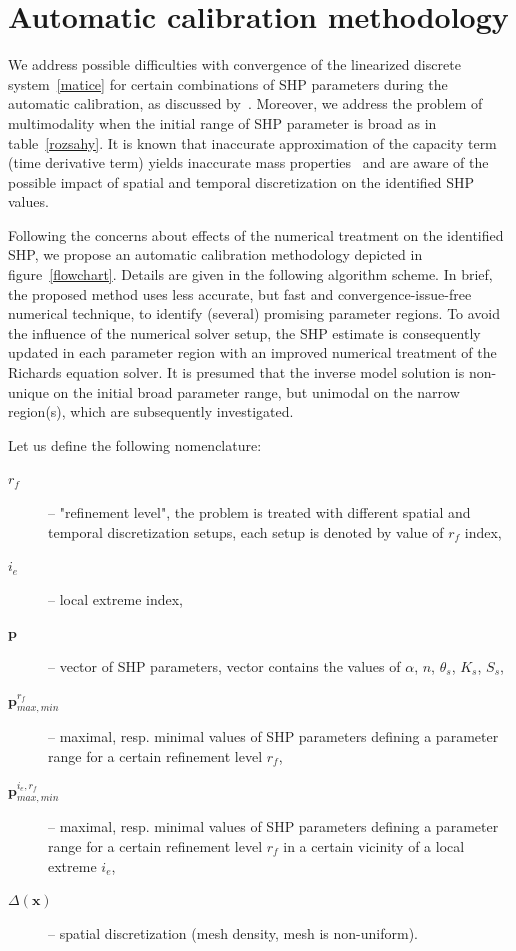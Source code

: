 \documentclass[review,times,3p,10pt]{elsarticle}
\renewcommand{\vec}{\mathbf}
\begin{document}
\section{Automatic calibration methodology}%
\label{methodo}



We address possible difficulties with convergence of the linearized discrete system~\eqref{matice} for certain combinations of SHP parameters during the automatic calibration, as discussed by~\cite{beven2003-uncertain}.
Moreover, we address the problem of multimodality when the initial range of SHP parameter is broad as in table~\ref{rozsahy}.
It is known that inaccurate approximation of the capacity term (time derivative term) yields inaccurate mass properties~\citep{celia} and are aware of the possible impact of spatial and temporal discretization on the identified SHP values.  

Following the concerns about effects of the numerical treatment on the identified SHP, we propose an automatic calibration methodology depicted in figure~\ref{flowchart}. Details are given in the following algorithm scheme. In brief, the proposed method uses less accurate, but fast and convergence-issue-free numerical technique, to identify (several) promising parameter regions. To avoid the influence of the numerical solver setup,  the SHP estimate is consequently updated in each parameter region with an improved numerical treatment of the Richards equation solver. It is presumed that the inverse model solution is non-unique on the initial broad parameter range, but unimodal on the narrow region(s), which are subsequently investigated. 

Let us define the following nomenclature: %

\hrulefill
\begin{description}
\item[$r_f$] -- "refinement level", the problem is treated with different spatial and temporal discretization setups, each setup is denoted by value of $r_f$ index,
\item[$i_e$] -- local extreme index,
\item[$\vec{p}$] -- vector of SHP parameters, vector contains the values of $\alpha$, $n$, $\theta_s$, $K_s$, $S_s$,
\item[$\vec{p}_{max,min}^{r_f}$] -- maximal, resp. minimal values of SHP parameters defining a parameter range for a certain refinement level $r_f$,
\item[$\vec{p}_{max,min}^{ i_e, r_f}$] -- maximal, resp. minimal values of SHP parameters defining a parameter range for a certain refinement level $r_f$ in a certain vicinity of a local extreme $i_e$,
\item[$\Delta(\vec{x})$] -- spatial discretization (mesh density, mesh is non-uniform).
\end{description}
\hrulefill
\end{document}
